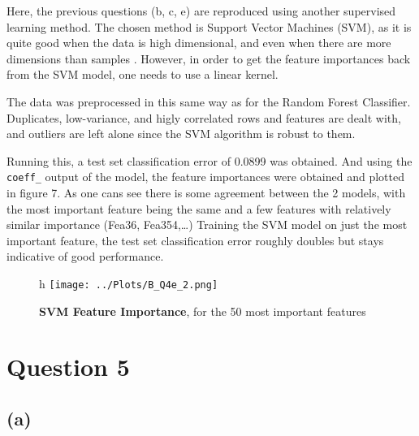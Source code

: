 \documentclass[12pt]{report} %
\begin{document}
Here, the previous questions (b, c, e) are reproduced using another supervised learning method. The chosen method is Support Vector Machines (SVM), as it is quite good when the data is high dimensional, and even when there are more dimensions than samples \cite{svm_sklearn}. However, in order to get the feature importances back from the SVM model, one needs to use a linear kernel. 

The data was preprocessed in this same way as for the Random Forest Classifier. Duplicates, low-variance, and higly correlated rows and features are dealt with, and outliers are left alone since the SVM algorithm is robust to them.  

Running this, a test set classification error of 0.0899 was obtained. And using the \texttt{coeff\_} output of the model, the feature importances were obtained and plotted in figure 7. As one cans see there is some agreement between the 2 models, with the most important feature being the same and a few features with relatively similar importance (Fea36, Fea354,\ldots)  
Training the SVM model on just the most important feature, the test set classification error roughly doubles but stays indicative of good performance.

\begin{figure}{h}
    \centering
    \texttt{[image: ../Plots/B\_Q4e\_2.png]}
    \caption{\textbf{SVM Feature Importance}, for the 50 most important features}
\end{figure}

\newpage

\section*{Question 5}

\subsection*{(a)}
\end{document}
